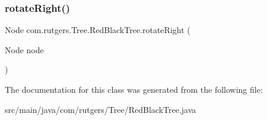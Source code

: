 \subsubsection{\texorpdfstring{rotate\+Right()}{rotateRight()}}
{\footnotesize\ttfamily Node com.\+rutgers.\+Tree.\+Red\+Black\+Tree.\+rotate\+Right (\begin{DoxyParamCaption}\item[{Node}]{node }\end{DoxyParamCaption})\hspace{0.3cm}{\ttfamily [protected]}}



The documentation for this class was generated from the following file\+:\begin{DoxyCompactItemize}
\item 
src/main/java/com/rutgers/\+Tree/Red\+Black\+Tree.\+java\end{DoxyCompactItemize}
